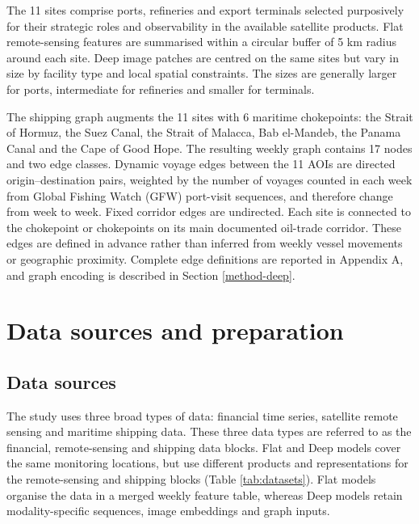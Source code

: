 \documentclass[
  british,
  12pt,
  oneside]{book}
\begin{document}
The 11 sites comprise ports, refineries and export terminals selected purposively for their strategic roles and observability in the available satellite products. Flat remote-sensing features are summarised within a circular buffer of 5 km radius around each site. Deep image patches are centred on the same sites but vary in size by facility type and local spatial constraints. The sizes are generally larger for ports, intermediate for refineries and smaller for terminals.

The shipping graph augments the 11 sites with 6 maritime chokepoints: the Strait of Hormuz, the Suez Canal, the Strait of Malacca, Bab el-Mandeb, the Panama Canal and the Cape of Good Hope. The resulting weekly graph contains 17 nodes and two edge classes. Dynamic voyage edges between the 11 AOIs are directed origin--destination pairs, weighted by the number of voyages counted in each week from Global Fishing Watch (GFW) port-visit sequences, and therefore change from week to week. Fixed corridor edges are undirected. Each site is connected to the chokepoint or chokepoints on its main documented oil-trade corridor. These edges are defined in advance rather than inferred from weekly vessel movements or geographic proximity. Complete edge definitions are reported in Appendix A, and graph encoding is described in Section \ref{method-deep}.

\section{Data sources and preparation}\label{method-data}

\subsection{Data sources}\label{method-data-sources}

The study uses three broad types of data: financial time series, satellite remote sensing and maritime shipping data. These three data types are referred to as the financial, remote-sensing and shipping data blocks. Flat and Deep models cover the same monitoring locations, but use different products and representations for the remote-sensing and shipping blocks (Table \ref{tab:datasets}). Flat models organise the data in a merged weekly feature table, whereas Deep models retain modality-specific sequences, image embeddings and graph inputs.
\end{document}
